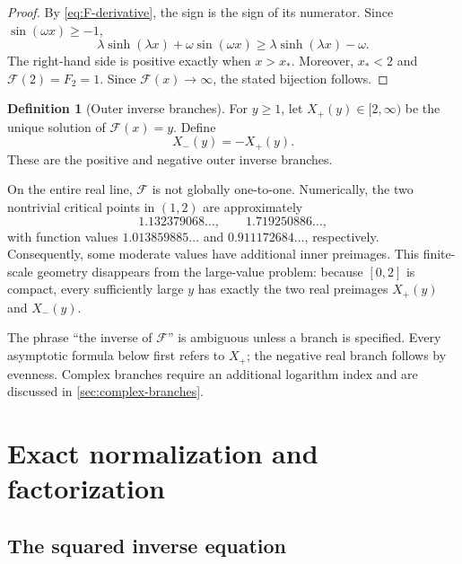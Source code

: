 \documentclass[11pt,oneside]{article}
\numberwithin{equation}{section}
\theoremstyle{plain}
\theoremstyle{definition}
\newtheorem{definition}[theorem]{Definition}
\theoremstyle{remark}
\newcommand{\Fcal}{\mathcal{F}}
\begin{document}
\begin{proof}
By \cref{eq:F-derivative}, the sign is the sign of its numerator.  Since
\(\sin(\omega x)\ge-1\),
\[
 \lambda\sinh(\lambda x)+\omega\sin(\omega x)
 \ge \lambda\sinh(\lambda x)-\omega.
\]
The right-hand side is positive exactly when \(x>x_*\).  Moreover,
\(x_*<2\) and \(\Fcal(2)=F_2=1\).  Since \(\Fcal(x)\to\infty\), the stated
bijection follows.
\end{proof}

\begin{definition}[Outer inverse branches]\label{def:outer-branches}
For \(y\ge1\), let \(X_+(y)\in[2,\infty)\) be the unique solution of
\(\Fcal(x)=y\).  Define
\[
 X_-(y)=-X_+(y).
\]
These are the positive and negative outer inverse branches.
\end{definition}

On the entire real line, \(\Fcal\) is not globally one-to-one.  Numerically,
the two nontrivial critical points in \((1,2)\) are approximately
\[
 1.132379068\ldots,
 \qquad
 1.719250886\ldots,
\]
with function values \(1.013859885\ldots\) and
\(0.911172684\ldots\), respectively.  Consequently, some moderate values
have additional inner preimages.  This finite-scale geometry disappears
from the large-value problem: because \([0,2]\) is compact, every
sufficiently large \(y\) has exactly the two real preimages \(X_+(y)\) and
\(X_-(y)\).

\begin{warningbox}
The phrase ``the inverse of \(\Fcal\)'' is ambiguous unless a branch is
specified.  Every asymptotic formula below first refers to \(X_+\); the
negative real branch follows by evenness.  Complex branches require an
additional logarithm index and are discussed in \cref{sec:complex-branches}.
\end{warningbox}

\section{Exact normalization and factorization}

\subsection{The squared inverse equation}
\end{document}
